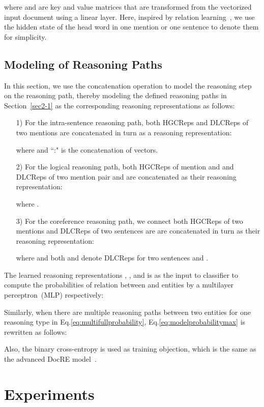 \documentclass[11pt,a4paper]{article}
\begin{document}
where  and  are key and value matrices that are transformed from the vectorized input document  using a linear layer.
Here, inspired by relation learning~\cite{match_blank}, we use the hidden state of the head word in one mention or one sentence to denote them for simplicity.


\subsection{Modeling of Reasoning Paths}
\label{sec3-3}
In this section, we use the concatenation operation to model the reasoning step on the reasoning path, thereby modeling the defined reasoning paths in Section~\ref{sec2-1} as the corresponding reasoning representations as follows:
\begin{enumerate}
\item[1)] For the intra-sentence reasoning path, both HGCReps and DLCReps of two mentions are concatenated in turn as a reasoning representation:

where  and ``:" is the concatenation of vectors.

\item[2)] For the logical reasoning path, both HGCReps of mention  and  and DLCReps of two mention pair  and  are concatenated as their reasoning representation: 

where .

\item[3)] For the coreference reasoning path, we connect both HGCReps of two mentions and DLCReps of two sentences are are concatenated in turn as their reasoning representation:

where  and both  and  denote DLCReps for two sentences  and .

\end{enumerate}

The learned reasoning representations , , and  is as the input to classifier to compute the probabilities of relation between  and  entities by a multilayer perceptron~(MLP) respectively:

Similarly, when there are multiple reasoning paths between two entities for one reasoning type in Eq.\ref{eq:multifullprobability}, Eq.\ref{eq:modelprobabilitymax} is rewritten as follows:

Also, the binary cross-entropy is used as training objection, which is the same as the advanced DocRE model~\cite{yao-etal-2019-docred}.

\section{Experiments}
\label{sec4}
\end{document}
